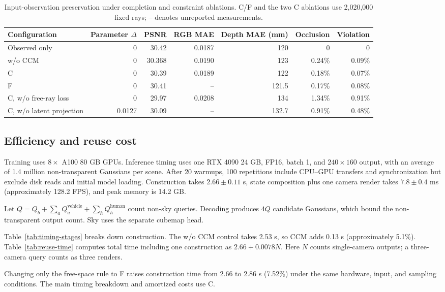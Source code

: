 \begin{table}[H]
\centering\small
\setlength{\tabcolsep}{4pt}
\caption{Input-observation preservation under completion and constraint ablations. C/F and the two C ablations use 2,020,000 fixed rays; -- denotes unreported measurements.}
\label{tab:preservation}
\begin{tabular}{@{}lrrrrrr@{}}
\toprule
Configuration & Parameter $\Delta$ & PSNR & RGB MAE & Depth MAE (mm) & Occlusion & Violation \\
\midrule
Observed only & 0 & 30.42 & 0.0187 & 120 & 0 & 0 \\
w/o CCM & 0 & 30.368 & 0.0190 & 123 & 0.24\% & 0.09\% \\
C & 0 & 30.39 & 0.0189 & 122 & 0.18\% & 0.07\% \\
F & 0 & 30.41 & -- & 121.5 & 0.17\% & 0.08\% \\
C, w/o free-ray loss & 0 & 29.97 & 0.0208 & 134 & 1.34\% & 0.91\% \\
C, w/o latent projection & 0.0127 & 30.09 & -- & 132.7 & 0.91\% & 0.48\% \\
\bottomrule
\end{tabular}
\end{table}
\begin{multicols}{2}

\section{Efficiency and reuse cost}
\label{sec:supp-timing}

Training uses $8\times$ A100 80 GB GPUs. Inference timing uses one RTX 4090 24 GB, FP16, batch 1, and $240\times160$ output, with an average of 1.4 million non-transparent Gaussians per scene. After 20 warmups, 100 repetitions include CPU--GPU transfers and synchronization but exclude disk reads and initial model loading. Construction takes $2.66\pm0.11$ s, state composition plus one camera render takes $7.8\pm0.4$ ms (approximately 128.2 FPS), and peak memory is 14.2 GB.

Let $Q=Q_b+\sum_a Q_a^{\mathrm{vehicle}}+\sum_h Q_h^{\mathrm{human}}$ count non-sky queries. Decoding produces $4Q$ candidate Gaussians, which bound the non-transparent output count. Sky uses the separate cubemap head.

Table~\ref{tab:timing-stages} breaks down construction. The w/o CCM control takes 2.53 s, so CCM adds 0.13 s (approximately 5.1\%). Table~\ref{tab:reuse-time} computes total time including one construction as $2.66+0.0078N$. Here $N$ counts single-camera outputs; a three-camera query counts as three renders.

Changing only the free-space rule to F raises construction time from 2.66 to 2.86 s (7.52\%) under the same hardware, input, and sampling conditions. The main timing breakdown and amortized costs use C.

\end{multicols}
